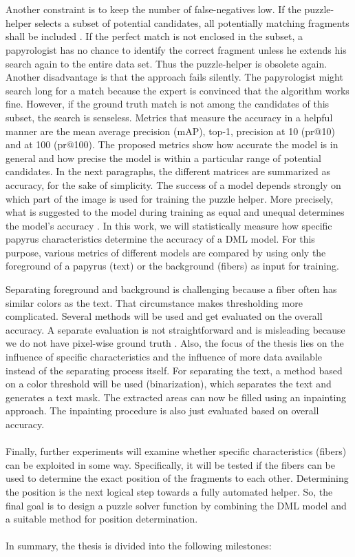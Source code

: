 \documentclass[12pt,a4paper]{article}
\begin{document}
\\\\
Another constraint is to keep the number of false-negatives low. If the puzzle-helper selects a subset of potential candidates, all potentially matching fragments shall be included . If the perfect match is not enclosed in the subset, a papyrologist has no chance to identify the correct fragment unless he extends his search again to the entire data set. Thus the puzzle-helper is obsolete again. Another disadvantage is that the approach fails silently. The papyrologist might search long for a match because the expert is convinced that the algorithm works fine. However, if the ground truth match is not among the candidates of this subset, the search is senseless. Metrics that measure the accuracy in a helpful manner are the mean average precision (mAP), top-1, precision at 10 (pr@10) and at 100 (pr@100).
The proposed metrics show how accurate the model is in general and how precise the model is within a particular range of potential candidates. In the next paragraphs, the different matrices are summarized as accuracy, for the sake of simplicity. The success of a model depends strongly on which part of the image is used for training the puzzle helper. More precisely, what is suggested to the model during training as equal and unequal determines the model's accuracy \cite{Pirrone21}. In this work, we will statistically measure how specific papyrus characteristics determine the accuracy of a DML model. For this purpose, various metrics of different models are compared by using only the foreground of a papyrus (text) or the background (fibers) as input for training. 

Separating foreground and background is challenging because a fiber often has similar colors as the text. That circumstance makes thresholding more complicated. Several methods will be used and get evaluated on the overall accuracy. A separate evaluation is not straightforward and is misleading because we do not have pixel-wise ground truth \cite{Tensmeyer20}. Also, the focus of the thesis lies on the influence of specific characteristics and the influence of more data available instead of the separating process itself. For separating the text,  a method based on a color threshold will be used (binarization), which separates the text and generates a text mask. 
The extracted areas can now be filled using an inpainting \cite{Ballester00} approach. The inpainting procedure is also just evaluated based on overall accuracy. 
\\\\
Finally, further experiments will examine whether specific characteristics (fibers) can be exploited in some way. Specifically, it will be tested if the fibers can be used to determine the exact position of the fragments to each other. Determining the position is the next logical step towards a fully automated helper. So, the final goal is to design a puzzle solver function by combining the DML model and a suitable method for position determination. 
\\\\
In summary, the thesis is divided into the following milestones:
\end{document}
